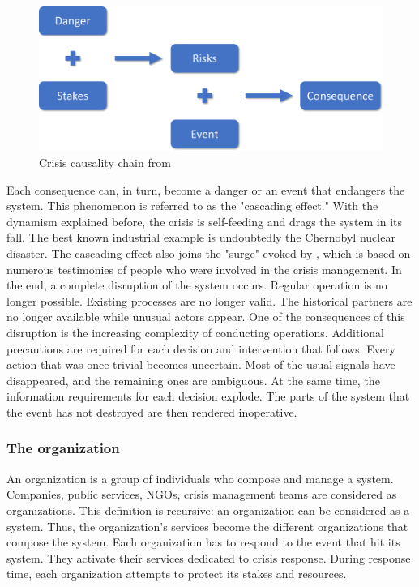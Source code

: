 \begin{figure}[htb]
    \centering
    \includegraphics[width=\textwidth]{figures/chap-1/fred-consequences-framework.pdf}
    \caption{Crisis causality chain from \textcite{benabenCollaborativeSystemsCrisis2014}}
    \label{context:fred-framework}
\end{figure}
\label{sec:danger-risk-consequence}

Each consequence can, in turn, become a danger or an event that endangers the system.
This phenomenon is referred to as the "cascading effect."
With the dynamism explained before, the crisis is self-feeding and drags the system in its fall.
The best known industrial example is undoubtedly the Chernobyl nuclear disaster.
The cascading effect also joins the "surge" evoked by \textcite{lagadecGESTIONCRISES1994}, which is based on numerous testimonies of people who were involved in the crisis management.
In the end, a complete disruption of the system occurs.
Regular operation is no longer possible.
Existing processes are no longer valid.
The historical partners are no longer available while unusual actors appear.
One of the consequences of this disruption is the increasing complexity of conducting operations.
Additional precautions are required for each decision and intervention that follows.
Every action that was once trivial becomes uncertain.
Most of the usual signals have disappeared, and the remaining ones are ambiguous.
At the same time, the information requirements for each decision explode.
The parts of the system that the event has not destroyed are then rendered inoperative.

\subsubsection{The organization}
An organization is a group of individuals who compose and manage a system.
Companies, public services, NGOs, crisis management teams are considered as organizations.
This definition is recursive: an organization can be considered as a system.
Thus, the organization's services become the different organizations that compose the system.
Each organization has to respond to the event that hit its system.
They activate their services dedicated to crisis response.
During response time, each organization attempts to protect its stakes and resources.


